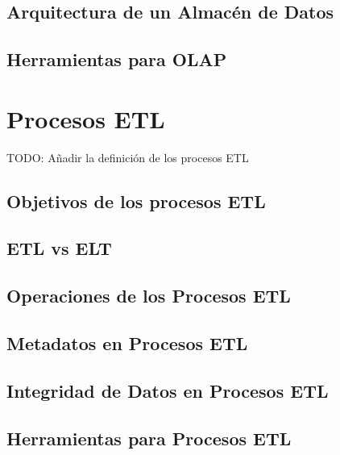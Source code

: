 \subsection{Arquitectura de un Almac\'en de Datos}
\subsection{Herramientas para OLAP}

\section{Procesos ETL}
TODO: A\~nadir la definici\'on de los procesos ETL
\subsection{Objetivos de los procesos ETL}
\subsection{ETL vs ELT}
\subsection{Operaciones de los Procesos ETL}
\subsection{Metadatos en Procesos ETL}
\subsection{Integridad de Datos en Procesos ETL}
\subsection{Herramientas para Procesos ETL}
